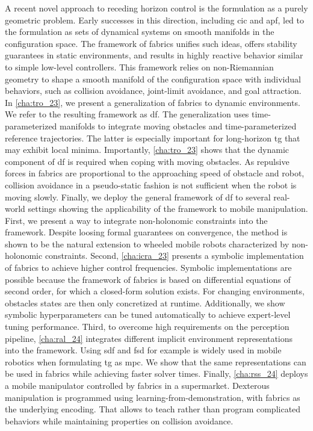 A recent novel approach to
receding horizon control is the formulation as a purely geometric problem.
Early successes in this direction, including \ac{cic} and \ac{apf}, led to the
formulation as sets of dynamical systems on smooth manifolds in the
configuration space. The framework of \acf{fabrics} unifies such ideas, 
offers stability guarantees in static environments, and results in highly
reactive behavior similar to simple low-level controllers.
This framework relies on non-Riemannian
geometry to shape a smooth manifold of the configuration space with individual
behaviors, such as collision avoidance, joint-limit avoidance, and goal 
attraction. In \cref{cha:tro_23}, we present a generalization of
\ac{fabrics} to dynamic environments. We refer to the resulting framework as
\ac{df}. The generalization uses time\hyp{}parameterized manifolds to integrate 
moving obstacles and time\hyp{}parameterized reference trajectories. The latter is
especially important for long-horizon \ac{tg} that may exhibit local minima.
Importantly, \cref{cha:tro_23} shows that the dynamic component of \ac{df}
is required when coping with moving obstacles. As repulsive forces 
in \ac{fabrics} are proportional to the approaching speed of obstacle and robot,
collision avoidance in a pseudo-static fashion is not sufficient when the robot
is moving slowly.
Finally, we deploy the general framework of \ac{df} to several real-world
settings showing the applicability of the framework to mobile manipulation.
First, we present a way to
integrate non\hyp{}holonomic constraints into the framework. Despite loosing
formal guarantees on convergence, the method is shown to be the natural extension
to wheeled mobile robots characterized by non\hyp{}holonomic constraints.
Second, \cref{cha:icra_23} presents a symbolic
implementation of \ac{fabrics} to achieve higher control frequencies.
Symbolic implementations are possible because the framework of \ac{fabrics}
is based on differential equations of second order, for which a closed-form
solution exists. For changing environments, obstacles states are then only
concretized at runtime.
Additionally, we show symbolic 
hyperparameters can be tuned automatically to achieve expert-level tuning performance.
Third, to overcome high requirements on the perception pipeline, \cref{cha:ral_24}
integrates different implicit environment representations into the framework.
Using \acf{sdf} and \acf{fsd} for example is widely used in mobile robotics when
formulating \ac{tg} as \ac{mpc}. We show that the same representations can be
used in \ac{fabrics} while achieving faster solver times.
Finally, 
\cref{cha:rss_24} deploys a mobile manipulator controlled by \ac{fabrics}
in a supermarket. Dexterous manipulation is programmed using
learning-from-demonstration, with \ac{fabrics} as the underlying encoding.
That allows to teach rather than program complicated behaviors while
maintaining properties on collision avoidance.

